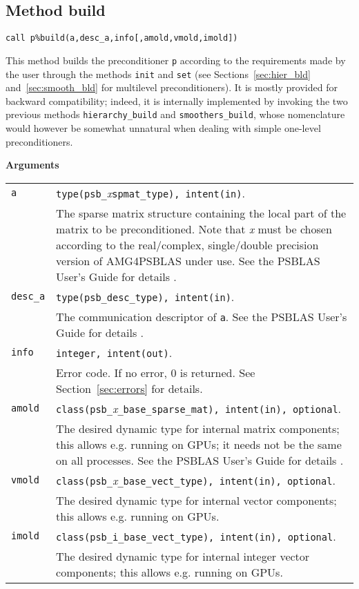 \clearpage

\subsection{Method build\label{sec:precbld}}

\begin{center}
\verb|call p%build(a,desc_a,info[,amold,vmold,imold])|\\
\end{center}

\noindent
This method builds the preconditioner \verb|p| according to the requirements
made by the user through the methods \verb|init| and \verb|set|
(see Sections~\ref{sec:hier_bld} and~\ref{sec:smooth_bld} for
multilevel preconditioners). It is mostly provided for backward
compatibility; indeed, it is internally implemented by invoking the
two previous methods \verb|hierarchy_build| and
\verb|smoothers_build|, whose nomenclature would however  be somewhat
unnatural when dealing with simple one-level preconditioners.

{\baselineskip\noindent\large\bfseries Arguments} \smallskip

\begin{tabular}{p{1.2cm}p{12cm}}
\verb|a|  & \verb|type(psb_|\emph{x}\verb|spmat_type), intent(in)|. \\
              & The sparse matrix structure containing the local part of the
                matrix to be preconditioned. Note that \emph{x} must be chosen according
                to the real/complex, single/double precision version of AMG4PSBLAS under use.
                See the PSBLAS User's Guide for details \cite{PSBLASGUIDE}.\\
\verb|desc_a| & \verb|type(psb_desc_type), intent(in)|. \\
              & The communication descriptor of \verb|a|. See the PSBLAS User's Guide for
                details \cite{PSBLASGUIDE}.\\
\verb|info|   & \verb|integer, intent(out)|.\\
              & Error code. If no error, 0 is returned. See Section~\ref{sec:errors} for details.\\
\verb|amold| & \verb|class(psb_|\emph{x}\verb|_base_sparse_mat), intent(in), optional|. \\
 & The desired dynamic type for internal matrix
  components; this allows e.g. running on GPUs; it needs not be the
  same on all processes. See the PSBLAS User's Guide for
  details \cite{PSBLASGUIDE}. \\
  \verb|vmold| & \verb|class(psb_|\emph{x}\verb|_base_vect_type), intent(in), optional|. \\
  & The desired dynamic type for internal vector
  components; this allows e.g. running on GPUs. \\
  \verb|imold| & \verb|class(psb_i_base_vect_type), intent(in), optional|. \\
  & The desired dynamic type for internal integer vector
  components; this allows e.g. running on GPUs. \\
\end{tabular}


